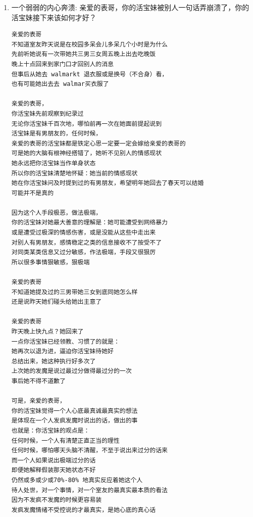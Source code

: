 \documentclass[9pt, b5paper]{article}
\begin{document}
\begin{enumerate}
\begin{verbatim}
今天她中午也回去了
一两点钟别人休息的时候她跑去厨房炸山炸厨房
会去买木条塞门下把门堵住
经不始她如此恶毒地故意打扰破坏别人的学习休息

知道她在家，感觉不太舒服
午休完就回学校了
带的有吃的，晚上会晚点儿十点回家

爱表哥，爱生活！！！
活宝妹就是一定要嫁给亲爱的表哥
爱表哥，爱生活！！！


亲爱的表哥，
她到目前为止，还没有任何收手或是停止的迹象
她或是怕谎言被证实，或是又一次地过敏
她的这种瞬间改变，如同上次水壶坏掉
她瞬间就改变成主要，最主要喝冷水了
只是这次活宝妹有前科之荐，知道她随时变换操作手法
不知道她会不会变本加厉
活宝妹会小心

爱表哥，爱生活！！！
活宝妹就是一定要嫁给亲爱的表哥
爱表哥，爱生活！！！
\end{verbatim}
\item 一个弱弱的内心奔溃: 亲爱的表哥，你的活宝妹被别人一句话弄崩溃了，你的活宝妹接下来该如何才好？
\label{sec-3-2-3-8}
\begin{verbatim}
亲爱的表哥
不知道室友昨天说是在校园多呆会儿多呆几个小时是为什么
先前听她说有一次带她共三男三女周五晚上出去吃晚饭
晚上十点回来到家门口才回别人的消息 
但事后从她去 walmarkt 退衣服或是换号（不合身）看，
也有可能她出去去 walmar买衣服了

亲爱的表哥，
你活宝妹先前观察到纪录过
无论你活宝妹千百次地，哪怕前再一次在她面前提起说到
活宝妹是有男朋友的，任何时候，
亲爱的表哥的活宝妹都是铁定心思一定要一定会嫁给亲爱的表哥的
可是她的大脑有根神经搭错了，她听不见别人的情感现状
她永远把你活宝妹当作单身状态
所以你的活宝妹清楚地怀疑：她当前的情感现状
她在你活宝妹问及时提到过的有男朋友，希望明年她回去了春天可以结婚
可能并不是真的

因为这个人手段极恶，做法极端，
你的活宝妹对她最大善意的理解是：她可能遭受到网络暴力
或是遭受过极深的情感伤害，或是没能从这些中走出来
对别人有男朋友，感情稳定之类的信息接收不了按受不了
对同类某类信息又过分敏感，作法极端，手段又很狠厉
所以很多事情狠敏感，狠极端

亲爱的表哥
不知道她提及过的三男带她三女到底同她怎么样
还是说昨天她们碰头给她出主意了

亲爱的表哥 
昨天晚上快九点？她回来了
一点你活宝妹已经领教、习惯了的就是：
她再次以退为进，逼迫你活宝妹待她好
总结出来，她这种执行好多次了
上次她的发魔是说过最过分做得最过分的一次
事后她不得不道歉了

可是，亲爱的表哥，
你的活宝妹觉得一个人心底最真诚最真实的想法
是体现在一个人发疯发魔时说出的话，做出的事
也就是：你活宝妹的观点是：
任何时候，一个人有清楚正直正当的理性
任何时候，哪怕哪天头脑不清醒，不至于说出来过分的话来
而一个人如果说出极端过分的话
即便她解释假装那天她状态不好
仍然或多或少或70%-80% 地真实反应着她这个人
待人处世，对一个事情，对一个室友的最真实最本质的看法
因为不发疯不发魔的时候更容易装
发疯发魔情绪不受控说的才最真实，是她心底的真心话


\end{verbatim}
\end{enumerate}
\end{document}
